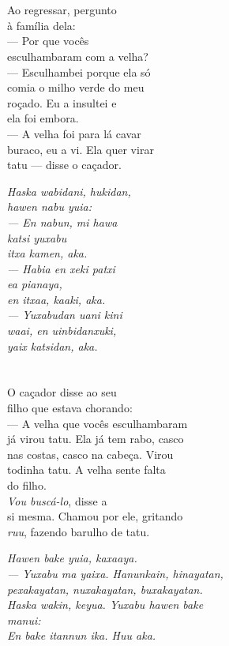 \chapter{}

Ao regressar, pergunto\\
à família dela:\\
--- Por que vocês\\
esculhambaram com a velha?\\
--- Esculhambei porque ela só\\
comia o milho verde do meu\\
roçado. Eu a insultei e\\
ela foi embora.\\
--- A velha foi para lá cavar\\
buraco, eu a vi. Ela quer virar\\
tatu — disse o caçador.

\textit{Haska wabidani, hukidan,\\
hawen nabu yuia:\\
--- En nabun, mi hawa\\
katsi yuxabu\\
itxa kamen, aka.\\
--- Habia en xeki patxi\\
ea pianaya,\\
en itxaa, kaaki, aka.\\
--- Yuxabudan uani kini\\
waai, en uinbidanxuki,\\
yaix katsidan, aka.}

\chapter{}

O caçador disse ao seu\\
filho que estava chorando:\\
--- A velha que vocês esculhambaram\\
já virou tatu. Ela já tem rabo, casco\\
nas costas, casco na cabeça. Virou\\
todinha tatu. A velha sente falta\\
do filho.\\ 
\textit{Vou buscá-lo}, disse a\\
si mesma. Chamou por ele, gritando\\
\textit{ruu}, fazendo barulho de tatu.

\textit{Hawen bake yuia, kaxaaya.\\
--- Yuxabu ma yaixa. Hanunkain, hinayatan,\\
pexakayatan, nuxakayatan, buxakayatan.\\
Haska wakin, keyua. Yuxabu hawen bake\\
manui:\\ 
\textit{En bake itannun} ika. \textit{Huu} aka.}

